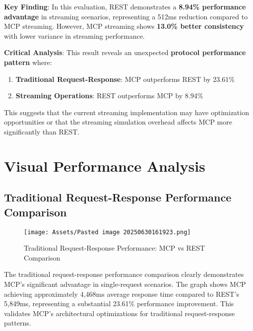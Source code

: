 \textbf{Key Finding}: In this evaluation, REST demonstrates a \textbf{8.94\% performance advantage} in streaming scenarios, representing a 512ms reduction compared to MCP streaming. However, MCP streaming shows \textbf{13.0\% better consistency} with lower variance in streaming performance.

\textbf{Critical Analysis}: This result reveals an unexpected \textbf{protocol performance pattern} where:
\begin{enumerate}
    \item \textbf{Traditional Request-Response}: MCP outperforms REST by 23.61\%
    \item \textbf{Streaming Operations}: REST outperforms MCP by 8.94\%
\end{enumerate}

This suggests that the current streaming implementation may have optimization opportunities or that the streaming simulation overhead affects MCP more significantly than REST.

\section{Visual Performance Analysis}

\subsection{Traditional Request-Response Performance Comparison}


\begin{figure}[h]
\centering
\texttt{[image: Assets/Pasted image 20250630161923.png]}
\caption{Traditional Request-Response Performance: MCP vs REST Comparison}
\label{fig:traditional_performance_comparison}
\end{figure}

The traditional request-response performance comparison clearly demonstrates MCP's significant advantage in single-request scenarios. The graph shows MCP achieving approximately 4,468ms average response time compared to REST's 5,849ms, representing a substantial 23.61\% performance improvement. This validates MCP's architectural optimizations for traditional request-response patterns.

